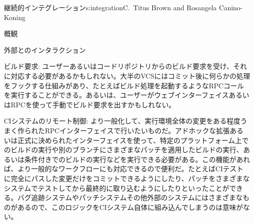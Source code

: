\begin{aosachapter}{継続的インテグレーション}{s:integration}{C.\ Titus Brown and Rosangela Canino-Koning}
\begin{aosasect1}{概観}
\begin{aosasect2}{外部とのインタラクション}
\begin{aosadescription}
  \item{ビルド要求}: ユーザーあるいはコードリポジトリからのビルド要求を受け、それに対応する必要があるかもしれない。大半のVCSにはコミット後に何らかの処理をフックする仕組みがあり、たとえばビルド処理を起動するようなRPCコールを実行することができる。あるいは、ユーザーがウェブインターフェイスあるいはRPCを使って手動でビルド要求を出すかもしれない。

  \item{CIシステムのリモート制御}: より一般化して、実行環境全体の変更をある程度うまく作られたRPCインターフェイスで行いたいものだ。アドホックな拡張あるいは正式に決められたインターフェイスを使って、特定のプラットフォーム上でのビルドの実行や別のブランチにさまざまなパッチを適用したビルドの実行、あるいは条件付きでのビルドの実行などを実行できる必要がある。この機能があれば、より一般的なワークフローにも対応できるので便利だ。たとえばCIテストに完全にパスした変更だけをコミットできるようにしたり、パッチをさまざまなシステムでテストしてから最終的に取り込むようにしたりといったことができる。バグ追跡システムやパッチシステムその他外部のシステムにはさまざまなものがあるので、このロジックをCIシステム自体に組み込んでしまうのは意味がない。

\end{aosadescription}

\end{aosasect2}


\end{aosasect1}
\end{aosachapter}
